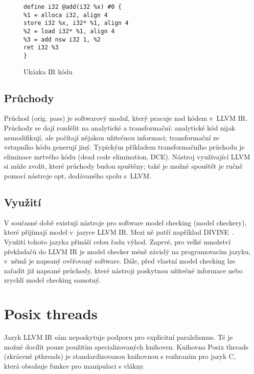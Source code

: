 \documentclass[12pt]{fithesis2}
\begin{document}
\begin{figure}[h!]
\begin{lstlisting}
define i32 @add(i32 %x) #0 {
%1 = alloca i32, align 4
store i32 %x, i32* %1, align 4
%2 = load i32* %1, align 4
%3 = add nsw i32 1, %2
ret i32 %3
}
\end{lstlisting}
\caption{Ukázka IR kódu}
\label{IR-EX}
\end{figure}

\subsection{Průchody}
Průchod (orig. pass) je softwarový modul, který pracuje nad kódem v~LLVM IR. Průchody se dají rozdělit na analytické a transformační: analytické kód nijak nemodifikují, ale počítají nějakou užitečnou informaci; transformační ze vstupního kódu generují jiný. Typickým příkladem transformačního průchodu je eliminace mrtvého kódu (dead code elimination, DCE). Nástroj využívající LLVM si může zvolit, které průchody budou spuštěny; také je možné spouštět je ručně pomocí nástroje opt, dodávaného spolu s~LLVM.

\subsection{Využití}
V současné době existují nástroje pro software model checking (model checkery), které přijímají model v~jazyce LLVM IR. Mezi ně patří například DIVINE~\cite{BBH+13}. Využití tohoto jazyka přináší celou řadu výhod. Zaprvé, pro velké množství překladačů do LLVM IR je model checker méně závislý na programovacím jazyku, v~němž je napsaný ověřovaný software. Dále, před vlastní model checking lze zařadit již napsané průchody, které nástroji poskytnou užitečné informace nebo zrychlí model checking samotný.



\section{Posix threads}
\label{sec:posix-threads}
Jazyk LLVM IR sám neposkytuje podporu pro explicitní paralelismus. Té je možné docílit pouze použitím specializovaných knihoven. Knihovna Posix threads (zkráceně pthreads) je standardizovanou knihovnou s rozhraním pro jazyk C, která obsahuje funkce pro manipulaci s vlákny.
\end{document}

